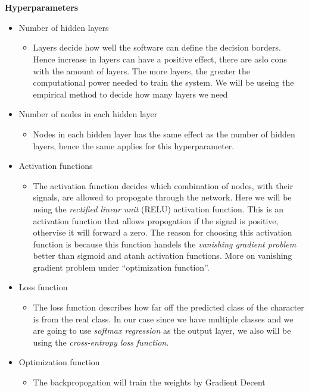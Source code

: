 \documentclass[11pt,a4paper,UKenglish]{article}
\begin{document}
\noindent \\
\noindent \\ \textbf{Hyperparameters}
\begin{itemize}
 \item{Number of hidden layers}
 \begin{itemize}
  \item{Layers decide how well the software can define the decision borders.
  Hence increase in layers can have a positive effect, there are aslo cons with
  the amount of layers. The more layers, the greater the computational power
  needed to train the system. We will be useing the empirical method to decide
  how many layers we need}
 \end{itemize}
 \item{Number of nodes in each hidden layer}
 \begin{itemize}
  \item{Nodes in each hidden layer has the same effect as the number of hidden
  layers, hence the same applies for this hyperparameter. }
 \end{itemize}
 \item{Activation functions}
 \begin{itemize}
  \item{The activation function decides which combination of nodes, with their
  signals, are allowed to propogate through the network. Here we will be using
  the \textit{rectified linear unit} (RELU) activation function. This is an
  activation function that allows propogation if the signal is positive,
  othervise it will forward a zero. The reason for choosing this activation
  function is because this function handels the \textit{vanishing gradient
  problem} better than sigmoid and atanh activation functions. More on
  vanishing gradient problem under ``optimization function''.}
 \end{itemize}
 \item{Loss function}
 \begin{itemize}
  \item{The loss function describes how far off the predicted class of the
  character is from the real class. In our case since we have multiple
  classes and we are going to use \textit{softmax regression} as the output
  layer, we also will be using the \textit{cross-entropy loss function}.}
 \end{itemize}
 \item{Optimization function}
 \begin{itemize}
  \item{The backpropogation will train the weights by Gradient Decent
}
\end{itemize}
\end{itemize}
\end{document}
